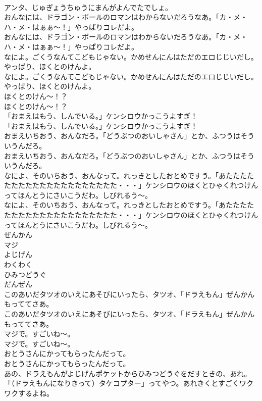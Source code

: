 \documentclass[8pt]{extreport}
\begin{document}
\begin{CJK}{UTF8}{min}
\\	アンタ、じゅぎょうちゅうにまんがよんでたでしょ。
\\	おんなには、ドラゴン・ボールのロマンはわからないだろうなあ。「カ・メ・ハ・メ・はぁぁ～！」やっぱりコレだよ。
\\	おんなには、ドラゴン・ボールのロマンはわからないだろうなあ。「カ・メ・ハ・メ・はぁぁ～！」やっぱりコレだよ。
\\	なによ。ごくうなんてこどもじゃない。かめせんにんはただのエロじじいだし。やっぱり、ほくとのけんよ。
\\	なによ。ごくうなんてこどもじゃない。かめせんにんはただのエロじじいだし。やっぱり、ほくとのけんよ。
\\	ほくとのけん～！？
\\	ほくとのけん～！？
\\	「おまえはもう、しんでいる。」ケンシロウかっこうよすぎ！
\\	「おまえはもう、しんでいる。」ケンシロウかっこうよすぎ！
\\	おまえいちおう、おんなだろ。「どうぶつのおいしゃさん」とか、ふつうはそういうんだろ。
\\	おまえいちおう、おんなだろ。「どうぶつのおいしゃさん」とか、ふつうはそういうんだろ。
\\	なによ、そのいちおう、おんなって。れっきとしたおとめですう。「あたたたたたたたたたたたたたたたたたたたた・・・」ケンシロウのほくとひゃくれつけんってほんとうにさいこうだわ。しびれるう～。
\\	なによ、そのいちおう、おんなって。れっきとしたおとめですう。「あたたたたたたたたたたたたたたたたたたたた・・・」ケンシロウのほくとひゃくれつけんってほんとうにさいこうだわ。しびれるう～。
\\	ぜんかん
\\	マジ
\\	よじげん
\\	わくわく
\\	ひみつどうぐ
\\	だんぜん
\\	このあいだタツオのいえにあそびにいったら、タツオ、「ドラえもん」ぜんかんもっててさあ。
\\	このあいだタツオのいえにあそびにいったら、タツオ、「ドラえもん」ぜんかんもっててさあ。
\\	マジで。すごいね～。
\\	マジで。すごいね～。
\\	おとうさんにかってもらったんだって。
\\	おとうさんにかってもらったんだって。
\\	あの、ドラえもんがよじげんポケットからひみつどうぐをだすときの、あれ。「（ドラえもんになりきって）タケコプター」ってやつ。あれきくとすごくワクワクするよね。

\end{CJK}
\end{document}
